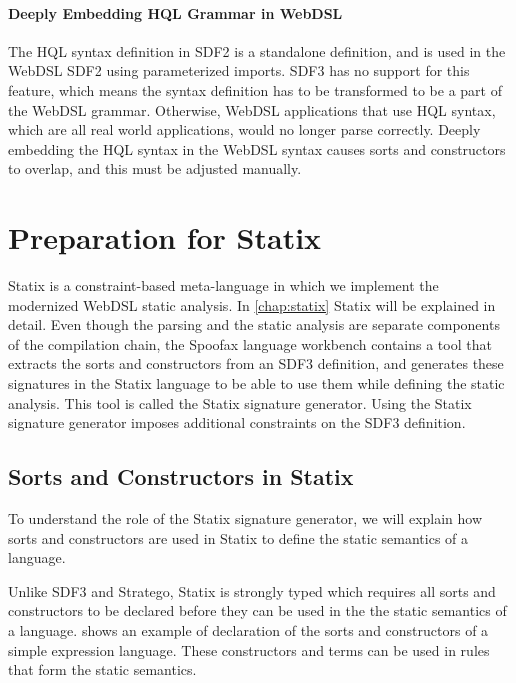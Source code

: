       \paragraph{Deeply Embedding HQL Grammar in WebDSL} The HQL syntax definition in SDF2 is a standalone definition, and is used in the WebDSL SDF2 using parameterized imports. SDF3 has no support for this feature, which means the syntax definition has to be transformed to be a part of the WebDSL grammar. Otherwise, WebDSL applications that use HQL syntax, which are all real world applications, would no longer parse correctly. Deeply embedding the HQL syntax in the WebDSL syntax causes sorts and constructors to overlap, and this must be adjusted manually.

  \section{\label{sec:preparation-for-statix}Preparation for Statix}

    Statix is a constraint-based meta-language in which we implement the modernized WebDSL static analysis. In \cref{chap:statix} Statix will be explained in detail. Even though the parsing and the static analysis are separate components of the compilation chain, the Spoofax language workbench contains a tool that extracts the sorts and constructors from an SDF3 definition, and generates these signatures in the Statix language to be able to use them while defining the static analysis. This tool is called the Statix signature generator. Using the Statix signature generator imposes additional constraints on the SDF3 definition.

    \subsection{\label{subsec:sorts-in-statix}Sorts and Constructors in Statix}

      To understand the role of the Statix signature generator, we will explain how sorts and constructors are used in Statix to define the static semantics of a language.

      Unlike SDF3 and Stratego, Statix is strongly typed which requires all sorts and constructors to be declared before they can be used in the the static semantics of a language.  shows an example of declaration of the sorts and constructors of a simple expression language. These constructors and terms can be used in rules that form the static semantics.

